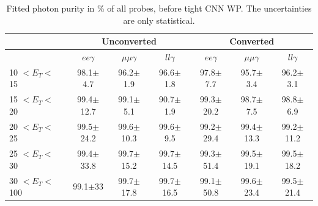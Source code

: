 \begin{table}[htbp]
\begin{longtable}[c]{lcccccc}
\hline\hline
                             & \multicolumn{3}{c}{Unconverted}               & \multicolumn{3}{c}{Converted}                \\
                            \hline
\endfirsthead
%
\endhead
%
                             & $ee\gamma$           & $\mu\mu\gamma$           & $ll\gamma$           & $ee\gamma$           &  $\mu\mu\gamma$          & $ll\gamma$           \\
    \hline
10 $ < E_T < $ 15 & 98.1$\pm$4.7   &   96.2$\pm$1.9   &   96.6$\pm$1.8   &   97.8$\pm$7.7   &   95.7$\pm$3.4    &   96.2$\pm$3.1  \\
15 $ < E_T < $ 20 & 99.4$\pm$12.7  &   99.1$\pm$5.1   &   90.7$\pm$1.9   &   99.3$\pm$20.2  &   98.7$\pm$7.5    &   98.8$\pm$6.9  \\
20 $ < E_T < $ 25 & 99.5$\pm$24.2  &   99.6$\pm$10.3  &   99.6$\pm$9.5   &   99.2$\pm$29.4  &   99.4$\pm$13.3   &   99.2$\pm$11.2 \\
25 $ < E_T < $ 30 & 99.4$\pm$33.8  &   99.7$\pm$15.2  &   99.7$\pm$14.5  &   99.3$\pm$51.4  &   99.5$\pm$19.1   &   99.5$\pm$18.2    \\
30 $ < E_T < $ 100 & 99.1$\pm$33   &   99.7$\pm$17.8  &   99.7$\pm$16.5  &   99.1$\pm$50.8  &   99.6$\pm$23.4   &   99.5$\pm$21.4 \\
\hline\hline
\end{longtable}
\begin{tcolorbox}[colback=black!5!white,colframe=white!75!black]
\caption{Fitted photon purity in \% of all probes, before tight CNN WP. The uncertainties are only statistical.}
\label{tab:gamma:CNN:Zllg:Purity:B}
\end{tcolorbox}
\end{table}

